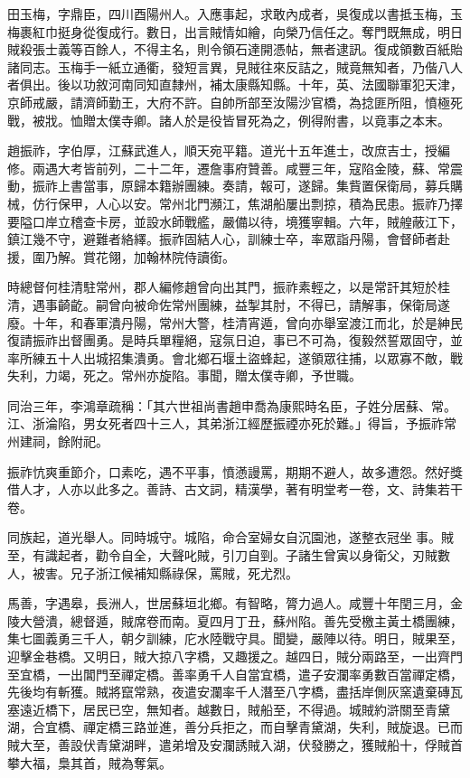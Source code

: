 \begin{pinyinscope}
田玉梅，字鼎臣，四川酉陽州人。入應事起，求敢內成者，吳復成以書抵玉梅，玉梅裹紅巾挺身從復成行。數日，出言賊情如繪，向榮乃信任之。奪門既無成，明日賊殺張士義等百餘人，不得主名，則令領石達開憑帖，無者逮訊。復成領數百紙貽諸同志。玉梅手一紙立通衢，發短言異，見賊往來反詰之，賊竟無知者，乃偕八人者俱出。後以功敘河南同知直隸州，補太康縣知縣。十年，英、法國聯軍犯天津，京師戒嚴，請濟師勤王，大府不許。自帥所部至汝陽沙官橋，為捻匪所阻，憤極死戰，被戕。恤贈太僕寺卿。諸人於是役皆冒死為之，例得附書，以竟事之本末。

趙振祚，字伯厚，江蘇武進人，順天宛平籍。道光十五年進士，改庶吉士，授編修。兩遇大考皆前列，二十二年，遷詹事府贊善。咸豐三年，寇陷金陵，蘇、常震動，振祚上書當事，原歸本籍辦團練。奏請，報可，遂歸。集貲置保衛局，募兵購械，仿行保甲，人心以安。常州北門瀕江，焦湖船屢出剽掠，積為民患。振祚乃擇要隘口岸立稽查卡房，並設水師戰艦，嚴備以待，境獲寧輯。六年，賊艎蔽江下，鎮江幾不守，避難者絡繹。振祚固結人心，訓練士卒，率眾詣丹陽，會督師者赴援，圍乃解。賞花翎，加翰林院侍讀銜。

時總督何桂清駐常州，郡人編修趙曾向出其門，振祚素輕之，以是常訐其短於桂清，遇事齮齕。嗣曾向被命佐常州團練，益掣其肘，不得已，請解事，保衛局遂廢。十年，和春軍潰丹陽，常州大警，桂清宵遁，曾向亦舉室渡江而北，於是紳民復請振祚出督團勇。是時兵單糧絕，寇氛日迫，事已不可為，復毅然誓眾固守，並率所練五十人出城招集潰勇。會北鄉石堰土盜蜂起，遂領眾往捕，以眾寡不敵，戰失利，力竭，死之。常州亦旋陷。事聞，贈太僕寺卿，予世職。

同治三年，李鴻章疏稱：「其六世祖尚書趙申喬為康熙時名臣，子姓分居蘇、常。江、浙淪陷，男女死者四十三人，其弟浙江經歷振禋亦死於難。」得旨，予振祚常州建祠，餘附祀。

振祚忼爽重節介，口素吃，遇不平事，憤懣謾罵，期期不避人，故多遭怨。然好獎借人才，人亦以此多之。善詩、古文詞，精漢學，著有明堂考一卷，文、詩集若干卷。

同族起，道光舉人。同時城守。城陷，命合室婦女自沉園池，遂整衣冠坐事。賊至，有識起者，勸令自全，大聲叱賊，引刀自剄。子諸生曾寅以身衛父，刃賊數人，被害。兄子浙江候補知縣祿保，罵賊，死尤烈。

馬善，字遇皋，長洲人，世居蘇垣北鄉。有智略，膂力過人。咸豐十年閏三月，金陵大營潰，總督遁，賊席卷而南。夏四月丁丑，蘇州陷。善先受檄主黃土橋團練，集七圖義勇三千人，朝夕訓練，庀水陸戰守具。聞變，嚴陣以待。明日，賊果至，迎擊金巷橋。又明日，賊大掠八字橋，又趣援之。越四日，賊分兩路至，一出齊門至宜橋，一出閶門至禪定橋。善率勇千人自當宜橋，遣子安瀾率勇數百當禪定橋，先後均有斬獲。賊將竄常熟，夜遣安瀾率千人潛至八字橋，盡括岸側灰窯遺棄磚瓦塞遠近橋下，居民已空，無知者。越數日，賊船至，不得過。城賊約滸關至青黛湖，合宜橋、禪定橋三路並進，善分兵拒之，而自擊青黛湖，失利，賊旋退。已而賊大至，善設伏青黛湖畔，遣弟增及安瀾誘賊入湖，伏發勝之，獲賊船十，俘賊首攀大福，梟其首，賊為奪氣。


\end{pinyinscope}
